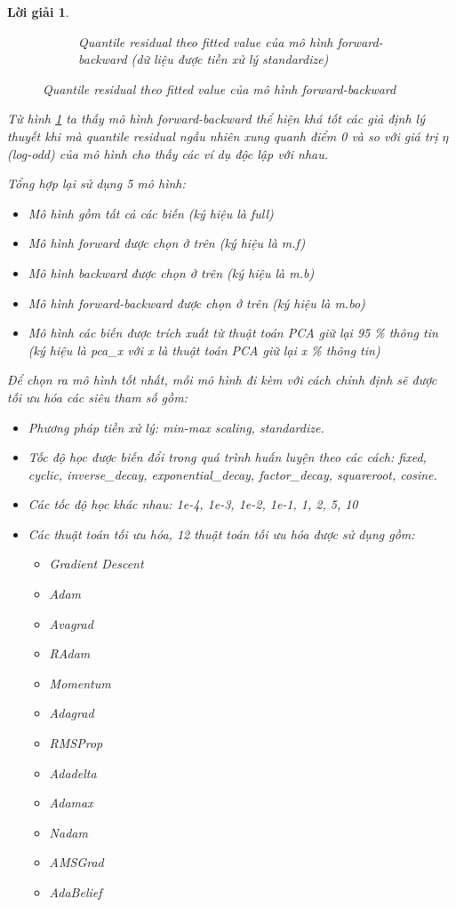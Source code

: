 \documentclass[14pt, a4paper]{article}
\theoremstyle{sltheorem}
\theoremstyle{soltheorem}
\newtheorem*{loigiai}{Lời giải}
\begin{document}
\begin{loigiai}
\begin{figure}[h!]
\begin{subfigure}[b]{0.4\textwidth}
            \caption{Quantile residual theo fitted value của mô hình forward-backward (dữ liệu được tiền xử lý standardize)}
        \end{subfigure}
        \caption{Quantile residual theo fitted value của mô hình forward-backward}
        \label{fig:Quantile-fitted-mbo}
    \end{figure}

    Từ hình \ref{fig:Quantile-fitted-mbo} ta thấy mô hình forward-backward thể hiện khá tốt các giả định lý
    thuyết khi mà quantile residual ngẫu nhiên xung quanh điểm 0 và so với giá trị $\eta$ (log-odd) của mô
    hình cho thấy các ví dụ độc lập với nhau.

    Tổng hợp lại sử dụng 5 mô hình:

    \begin{itemize}
        \item Mô hình gồm tất cả các biến (ký hiệu là full)
        \item Mô hình forward được chọn ở trên (ký hiệu là m.f)
        \item Mô hình backward được chọn ở trên (ký hiệu là m.b)
        \item Mô hình forward-backward được chọn ở trên (ký hiệu là m.bo)
        \item Mô hình các biến được trích xuất từ thuật toán PCA giữ lại 95 \% thông tin (ký hiệu là pca\_x với x là thuật toán PCA giữ lại x \% thông tin)
    \end{itemize}

    Để chọn ra mô hình tốt nhất, mỗi mô hình đi kèm với cách chỉnh định sẽ được tối ưu hóa các siêu tham số gồm:

    \begin{itemize}
        \item Phương pháp tiền xử lý: min-max scaling, standardize.
        \item Tốc độ học được biến đổi trong quá trình huấn luyện theo các cách: fixed, cyclic, inverse\_decay, exponential\_decay, factor\_decay, squareroot, cosine.
        \item Các tốc độ học khác nhau: 1e-4, 1e-3, 1e-2, 1e-1, 1, 2, 5, 10
        \item Các thuật toán tối ưu hóa, 12 thuật toán tối ưu hóa được sử dụng gồm:
        \begin{itemize}
            \item Gradient Descent
            \item Adam
            \item Avagrad
            \item RAdam
            \item Momentum
            \item Adagrad
            \item RMSProp
            \item Adadelta
            \item Adamax
            \item Nadam
            \item AMSGrad
            \item AdaBelief
        \end{itemize}


\end{itemize}
\end{loigiai}
\end{document}
